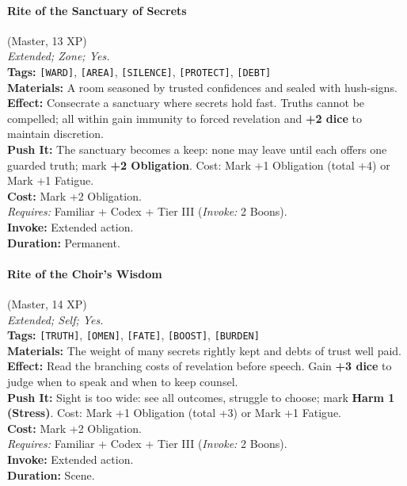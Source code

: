 \paragraph{Rite of the Sanctuary of Secrets} (Master, 13 XP) \hfill \\
\emph{Extended; Zone; Yes.} \\
\textbf{Tags:} \texttt{[WARD]}, \texttt{[AREA]}, \texttt{[SILENCE]}, \texttt{[PROTECT]}, \texttt{[DEBT]} \\
\textbf{Materials:} A room seasoned by trusted confidences and sealed with hush-signs. \\
\textbf{Effect:} Consecrate a sanctuary where secrets hold fast. Truths cannot be compelled; all within gain immunity to forced revelation and \textbf{+2 dice} to maintain discretion. \\
\textbf{Push It:} The sanctuary becomes a keep: none may leave until each offers one guarded truth; mark \textbf{+2 Obligation}. Cost: Mark +1 Obligation (total +4) or Mark +1 Fatigue. \\
\textbf{Cost:} Mark +2 Obligation. \\
\textit{Requires:} Familiar + Codex + Tier III (\textit{Invoke:} 2 Boons). \\
\textbf{Invoke:} Extended action. \\
\textbf{Duration:} Permanent.

\paragraph{Rite of the Choir's Wisdom} (Master, 14 XP) \hfill \\
\emph{Extended; Self; Yes.} \\
\textbf{Tags:} \texttt{[TRUTH]}, \texttt{[OMEN]}, \texttt{[FATE]}, \texttt{[BOOST]}, \texttt{[BURDEN]} \\
\textbf{Materials:} The weight of many secrets rightly kept and debts of trust well paid. \\
\textbf{Effect:} Read the branching costs of revelation before speech. Gain \textbf{+3 dice} to judge when to speak and when to keep counsel. \\
\textbf{Push It:} Sight is too wide: see all outcomes, struggle to choose; mark \textbf{Harm 1 (Stress)}. Cost: Mark +1 Obligation (total +3) or Mark +1 Fatigue. \\
\textbf{Cost:} Mark +2 Obligation. \\
\textit{Requires:} Familiar + Codex + Tier III (\textit{Invoke:} 2 Boons). \\
\textbf{Invoke:} Extended action. \\
\textbf{Duration:} Scene.

